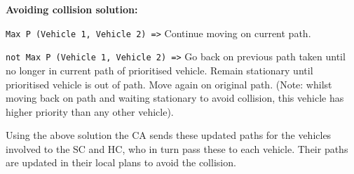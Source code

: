 \textbf{Avoiding collision solution:}


\texttt{Max P (Vehicle 1, Vehicle 2) =>} Continue moving on current path.

\texttt{not Max P (Vehicle 1, Vehicle 2) =>} Go back on previous path taken until no longer in current path of prioritised vehicle. Remain stationary until prioritised vehicle is out of path. Move again on original path. (Note: whilst moving back on path and waiting stationary to avoid collision, this vehicle has higher priority than any other vehicle).

Using the above solution the CA sends these updated paths for the vehicles involved to the SC and HC, who in turn pass these to each vehicle. Their paths are updated in their local plans to avoid the collision.  







